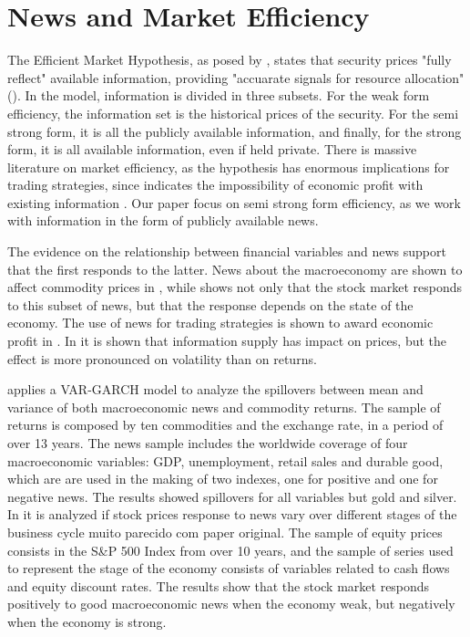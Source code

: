 \documentclass[cic,tc, english]{iiufrgs}
\begin{document}
\chapter{News and Market Efficiency} \label{chapter_literature}

    The Efficient Market Hypothesis, as posed by \citet{fama1970}, states that security prices "fully reflect" available information, providing "accuarate signals for resource allocation" (\citet{fama1970}). In the model, information is divided in three subsets. For the weak form efficiency, the information set is the historical prices of the security. For the semi strong form, it is all the publicly available information, and finally, for the strong form, it is all available information, even if held private. There is massive literature on market efficiency, as the hypothesis has enormous implications for trading strategies, since indicates the impossibility of economic profit with existing information \citet{kamal2014}. Our paper focus on semi strong form efficiency, as we work with information in the form of publicly available news.

    The evidence on the relationship between financial variables and news support that the first responds to the latter. News about the macroeconomy are shown to affect commodity prices in \citet{caporaleetal2015}, while \citet{macqueenroley1993} shows not only that the stock market responds to this subset of news, but that the response depends on the state of the economy. The use of news for trading strategies is shown to award economic profit in \citet{larsenthorsrud2017}. In \citet{moussaetal2017} it is shown that information supply has impact on prices, but the effect is more pronounced on volatility than on returns.

    \citet{caporaleetal2015} applies a VAR-GARCH model to analyze the spillovers between mean and variance of both macroeconomic news and commodity returns. The sample of returns is composed by ten commodities and the exchange rate, in a period of over 13 years. The news sample includes the worldwide coverage of four macroeconomic variables: GDP, unemployment, retail sales and durable good, which are are used in the making of two indexes, one for positive and one for negative news. The results showed spillovers for all variables but gold and silver.
    In \citet{macqueenroley1993} it is analyzed if stock prices response to news vary over different stages of the business cycle {muito parecido com paper original}. The sample of equity prices consists in the S\&P 500 Index from over 10 years, and the sample of series used to represent the stage of the economy consists of variables related to cash flows and equity discount rates. The results show that the stock market responds positively to good macroeconomic news when the economy weak, but negatively when the economy is strong.
\end{document}
